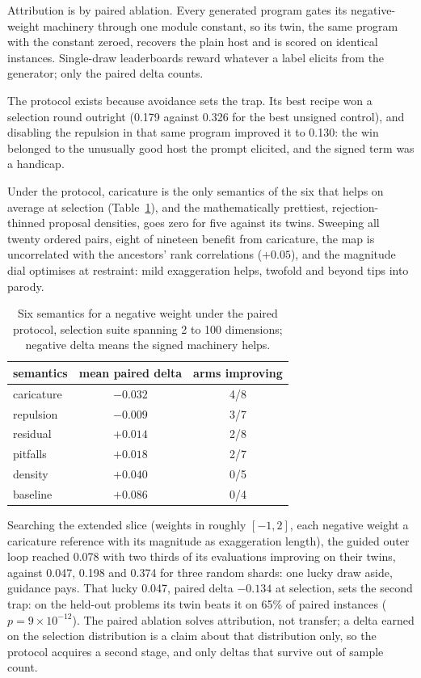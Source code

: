 \documentclass[11pt]{article}
\begin{document}
Attribution is by paired ablation. Every generated program gates its
negative-weight machinery through one module constant, so its twin, the
same program with the constant zeroed, recovers the plain host and is
scored on identical instances. Single-draw leaderboards reward whatever a
label elicits from the generator; only the paired delta counts.

The protocol exists because avoidance sets the trap. Its best recipe won a
selection round outright (0.179 against 0.326 for the best unsigned
control), and disabling the repulsion in that same program improved it to
0.130: the win belonged to the unusually good host the prompt elicited, and
the signed term was a handicap.

Under the protocol, caricature is the only semantics of the six that helps
on average at selection (Table~\ref{tab:sem}), and the mathematically
prettiest, rejection-thinned proposal densities, goes zero for five against
its twins. Sweeping all twenty ordered pairs, eight of nineteen benefit
from caricature, the map is uncorrelated with the ancestors' rank
correlations ($+0.05$), and the magnitude dial optimises at restraint: mild
exaggeration helps, twofold and beyond tips into parody.

\begin{table}[h]
\centering
\begin{tabular}{lcc}
\toprule
semantics & mean paired delta & arms improving \\
\midrule
caricature & $-0.032$ & 4/8 \\
repulsion  & $-0.009$ & 3/7 \\
residual   & $+0.014$ & 2/8 \\
pitfalls   & $+0.018$ & 2/7 \\
density    & $+0.040$ & 0/5 \\
baseline   & $+0.086$ & 0/4 \\
\bottomrule
\end{tabular}
\caption{Six semantics for a negative weight under the paired protocol,
selection suite spanning 2 to 100 dimensions; negative delta means the
signed machinery helps.}
\label{tab:sem}
\end{table}

Searching the extended slice (weights in roughly $[-1,2]$, each negative
weight a caricature reference with its magnitude as exaggeration length),
the guided outer loop reached 0.078 with two thirds of its evaluations
improving on their twins, against 0.047, 0.198 and 0.374 for three random
shards: one lucky draw aside, guidance pays. That lucky 0.047, paired delta
$-0.134$ at selection, sets the second trap: on the held-out problems its
twin beats it on 65\% of paired instances ($p = 9\times10^{-12}$). The
paired ablation solves attribution, not transfer; a delta earned on the
selection distribution is a claim about that distribution only, so the
protocol acquires a second stage, and only deltas that survive out of
sample count.
\end{document}
